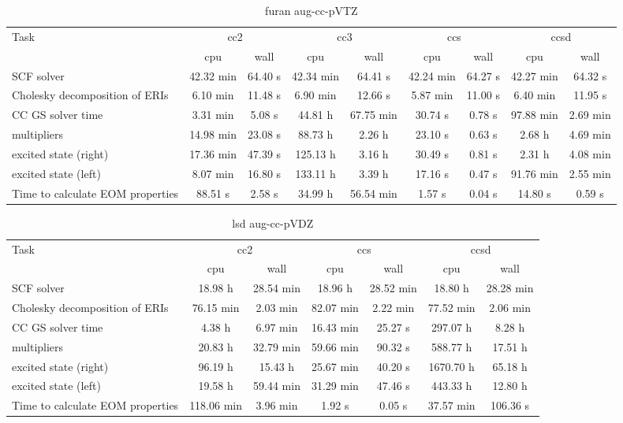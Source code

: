 \documentclass{article}
\begin{document}
\begin{table}
\caption{furan aug-cc-pVTZ}
\begin{tabular}{lcccccccc}
\toprule
Task & \multicolumn{2}{c}{cc2} & \multicolumn{2}{c}{cc3} & \multicolumn{2}{c}{ccs} & \multicolumn{2}{c}{ccsd}\\
\cmidrule(lr){2-3}\cmidrule(lr){4-5}\cmidrule(lr){6-7}\cmidrule(lr){8-9}
 & cpu & wall & cpu & wall & cpu & wall & cpu & wall\\
\midrule
SCF solver & 42.32 min & 64.40 s & 42.34 min & 64.41 s & 42.24 min & 64.27 s & 42.27 min & 64.32 s\\
Cholesky decomposition of ERIs & 6.10 min & 11.48 s & 6.90 min & 12.66 s & 5.87 min & 11.00 s & 6.40 min & 11.95 s\\
CC GS solver time & 3.31 min & 5.08 s & 44.81 h & 67.75 min & 30.74 s & 0.78 s & 97.88 min & 2.69 min\\
multipliers & 14.98 min & 23.08 s & 88.73 h & 2.26 h & 23.10 s & 0.63 s & 2.68 h & 4.69 min\\
excited state (right) & 17.36 min & 47.39 s & 125.13 h & 3.16 h & 30.49 s & 0.81 s & 2.31 h & 4.08 min\\
excited state (left) & 8.07 min & 16.80 s & 133.11 h & 3.39 h & 17.16 s & 0.47 s & 91.76 min & 2.55 min\\
Time to calculate EOM properties & 88.51 s & 2.58 s & 34.99 h & 56.54 min & 1.57 s & 0.04 s & 14.80 s & 0.59 s\\
\bottomrule
\end{tabular}
\end{table}
\begin{table}
\caption{lsd aug-cc-pVDZ}
\begin{tabular}{lcccccc}
\toprule
Task & \multicolumn{2}{c}{cc2} & \multicolumn{2}{c}{ccs} & \multicolumn{2}{c}{ccsd}\\
\cmidrule(lr){2-3}\cmidrule(lr){4-5}\cmidrule(lr){6-7}
 & cpu & wall & cpu & wall & cpu & wall\\
\midrule
SCF solver & 18.98 h & 28.54 min & 18.96 h & 28.52 min & 18.80 h & 28.28 min\\
Cholesky decomposition of ERIs & 76.15 min & 2.03 min & 82.07 min & 2.22 min & 77.52 min & 2.06 min\\
CC GS solver time & 4.38 h & 6.97 min & 16.43 min & 25.27 s & 297.07 h & 8.28 h\\
multipliers & 20.83 h & 32.79 min & 59.66 min & 90.32 s & 588.77 h & 17.51 h\\
excited state (right) & 96.19 h & 15.43 h & 25.67 min & 40.20 s & 1670.70 h & 65.18 h\\
excited state (left) & 19.58 h & 59.44 min & 31.29 min & 47.46 s & 443.33 h & 12.80 h\\
Time to calculate EOM properties & 118.06 min & 3.96 min & 1.92 s & 0.05 s & 37.57 min & 106.36 s\\
\bottomrule
\end{tabular}
\end{table}
\end{document}
